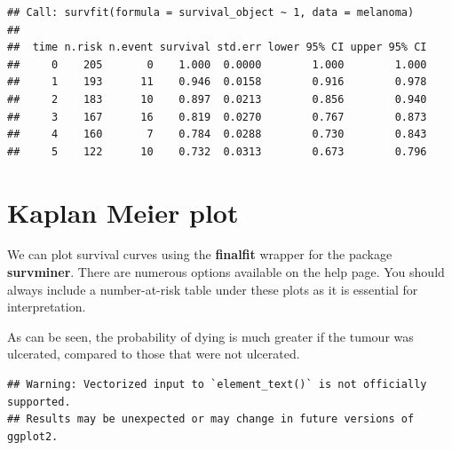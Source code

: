\documentclass[
  12pt,
  krantz2]{krantz}
\makeatletter
\newenvironment{Shaded}{\begin{snugshade}}{\end{snugshade}}
\newcommand{\CommentTok}[1]{\textcolor[rgb]{0.56,0.35,0.01}{\textit{#1}}}
\newcommand{\DataTypeTok}[1]{\textcolor[rgb]{0.13,0.29,0.53}{#1}}
\newcommand{\KeywordTok}[1]{\textcolor[rgb]{0.13,0.29,0.53}{\textbf{#1}}}
\newcommand{\NormalTok}[1]{#1}
\newcommand{\OperatorTok}[1]{\textcolor[rgb]{0.81,0.36,0.00}{\textbf{#1}}}
\newcommand{\OtherTok}[1]{\textcolor[rgb]{0.56,0.35,0.01}{#1}}
\newcommand{\StringTok}[1]{\textcolor[rgb]{0.31,0.60,0.02}{#1}}
\newenvironment{kframe}{%
\medskip{}
\setlength{\fboxsep}{.8em}
 \def\at@end@of@kframe{}%
 \ifinner\ifhmode%
  \def\at@end@of@kframe{\end{minipage}}%
  \begin{minipage}{\columnwidth}%
 \fi\fi%
 \def\FrameCommand##1{\hskip\@totalleftmargin \hskip-\fboxsep
 \colorbox{shadecolor}{##1}\hskip-\fboxsep
     \hskip-\linewidth \hskip-\@totalleftmargin \hskip\columnwidth}%
 \MakeFramed {\advance\hsize-\width
   \@totalleftmargin\z@ \linewidth\hsize
   \@setminipage}}%
 {\par\unskip\endMakeFramed%
 \at@end@of@kframe}
\renewenvironment{Shaded}{\begin{kframe}}{\end{kframe}}
\makeatother
\begin{document}
\begin{verbatim}
## Call: survfit(formula = survival_object ~ 1, data = melanoma)
## 
##  time n.risk n.event survival std.err lower 95% CI upper 95% CI
##     0    205       0    1.000  0.0000        1.000        1.000
##     1    193      11    0.946  0.0158        0.916        0.978
##     2    183      10    0.897  0.0213        0.856        0.940
##     3    167      16    0.819  0.0270        0.767        0.873
##     4    160       7    0.784  0.0288        0.730        0.843
##     5    122      10    0.732  0.0313        0.673        0.796
\end{verbatim}

\begin{Shaded}
\end{Shaded}

\hypertarget{kaplan-meier-plot}{%
\section{Kaplan Meier plot}\label{kaplan-meier-plot}}


We can plot survival curves using the \textbf{finalfit} wrapper for the package \textbf{survminer}.
There are numerous options available on the help page.
You should always include a number-at-risk table under these plots as it is essential for interpretation.

As can be seen, the probability of dying is much greater if the tumour was ulcerated, compared to those that were not ulcerated.

\begin{Shaded}
\end{Shaded}

\begin{verbatim}
## Warning: Vectorized input to `element_text()` is not officially supported.
## Results may be unexpected or may change in future versions of ggplot2.
\end{verbatim}
\end{document}
